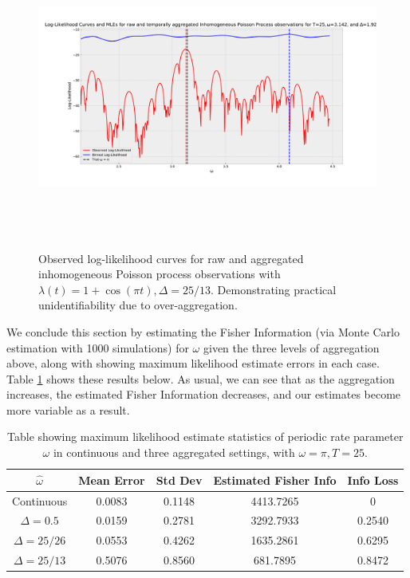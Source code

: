 \documentclass[11pt,a4,twosided,singlespacing,titlepagenumber=on,numbers=endperiod]{scrreprt}
\numberwithin{equation}{chapter} %
\theoremstyle{remark}
\begin{document}
\begin{figure}[!h]
	\includegraphics[height=10cm, width=16cm]{nhpp_periodic_unid_log_likeli.pdf}
	\centering
	\caption{Observed log-likelihood curves for raw and aggregated inhomogeneous Poisson process observations with $\lambda(t)= 1 + \cos(\pi t), \Delta=25/13$. Demonstrating practical unidentifiability due to over-aggregation.}
	\label{fig:nhpp_periodic_unid_log_likeli}
\end{figure}
\newpage\noindent
We conclude this section by estimating the Fisher Information (via Monte Carlo estimation with 1000 simulations) for $\omega$ given the three levels of aggregation above, along with showing maximum likelihood estimate errors in each case. Table \ref{tab:nhpp_periodic_errors} shows these results below. As usual, we can see that as the aggregation increases, the estimated Fisher Information decreases, and our estimates become more variable as a result.
\begin{table}[ht]
	\centering
	\begin{tabular}{|c|c|c|c|c|}
	\hline
		$\hat{\omega}$ & Mean Error & Std Dev & Estimated Fisher Info & Info Loss \\
	\hline
		Continuous & 0.0083 & 0.1148 & 4413.7265 & 0 \\
	\hline
		$\Delta=0.5$  & 0.0159 & 0.2781 & 3292.7933 & 0.2540 \\
	\hline
		$\Delta=25/26$  & 0.0553 & 0.4262 & 1635.2861 & 0.6295 \\
	\hline
		$\Delta=25/13$  & 0.5076 & 0.8560 & 681.7895 & 0.8472 \\
	\hline
	\end{tabular}
	\caption{Table showing maximum likelihood estimate statistics of periodic rate parameter $\omega$ in continuous and three aggregated settings, with $\omega=\pi, T=25$.}
	\label{tab:nhpp_periodic_errors}
\end{table}\\
\end{document}
